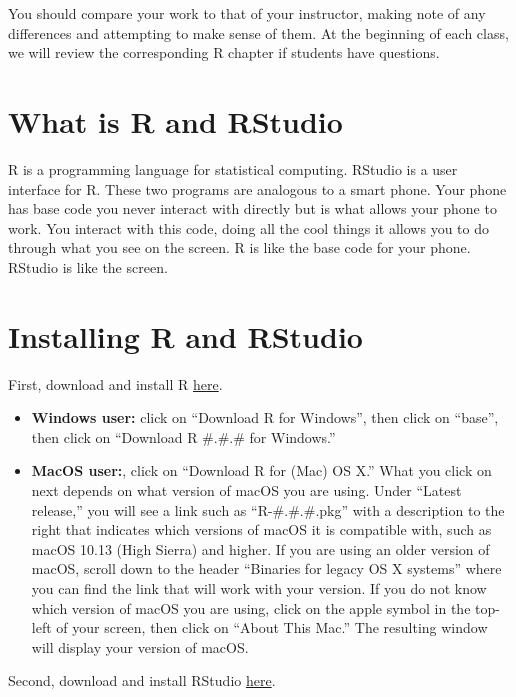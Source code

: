 \documentclass[
]{book}
\providecommand{\tightlist}{%
  \setlength{\itemsep}{0pt}\setlength{\parskip}{0pt}}
\begin{document}
You should compare your work to that of your instructor, making note of any differences and attempting to make sense of them. At the beginning of each class, we will review the corresponding R chapter if students have questions.

\hypertarget{what-is-r-and-rstudio}{%
\section{What is R and RStudio}\label{what-is-r-and-rstudio}}

R is a programming language for statistical computing. RStudio is a user interface for R. These two programs are analogous to a smart phone. Your phone has base code you never interact with directly but is what allows your phone to work. You interact with this code, doing all the cool things it allows you to do through what you see on the screen. R is like the base code for your phone. RStudio is like the screen.

\hypertarget{installing-r-and-rstudio}{%
\section{Installing R and RStudio}\label{installing-r-and-rstudio}}

First, download and install R \href{https://cloud.r-project.org/}{here}.

\begin{itemize}
\tightlist
\item
  \textbf{Windows user:} click on ``Download R for Windows'', then click on ``base'', then click on ``Download R \#.\#.\# for Windows.''
\item
  \textbf{MacOS user:}, click on ``Download R for (Mac) OS X.'' What you click on next depends on what version of macOS you are using. Under ``Latest release,'' you will see a link such as ``R-\#.\#.\#.pkg'' with a description to the right that indicates which versions of macOS it is compatible with, such as macOS 10.13 (High Sierra) and higher. If you are using an older version of macOS, scroll down to the header ``Binaries for legacy OS X systems'' where you can find the link that will work with your version. If you do not know which version of macOS you are using, click on the apple symbol in the top-left of your screen, then click on ``About This Mac.'' The resulting window will display your version of macOS.
\end{itemize}

Second, download and install RStudio \href{https://www.rstudio.com/products/rstudio/download/}{here}.
\end{document}

